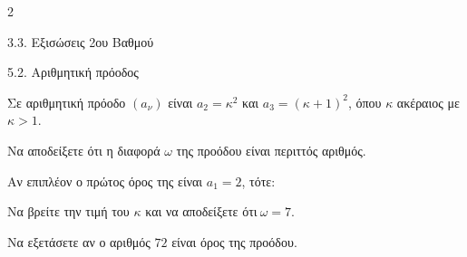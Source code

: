 \begin{ylh}{2}
    \item 3.3. Εξισώσεις 2ου Βαθμού
    \item 5.2. Αριθμητική πρόοδος
\end{ylh}
Σε αριθμητική πρόοδο $\left( a_{\nu} \right)$ είναι $a_{2} = \kappa^{2}$ και $a_{3} = (\kappa + 1)^{2}$, όπου $\kappa$ ακέραιος με $\kappa > 1$.

\begin{alist}
\item Να αποδείξετε ότι η διαφορά $\omega$ της προόδου είναι περιττός αριθμός.
\item Αν επιπλέον ο πρώτος όρος της είναι $a_{1} = 2$, τότε:
\begin{rlist}
\item
  Να βρείτε την τιμή του $\kappa$ και να αποδείξετε ότι$\ \omega = 7$.
\item
  Να εξετάσετε αν ο αριθμός $72$ είναι όρος της προόδου.
\end{rlist}
\end{alist}

